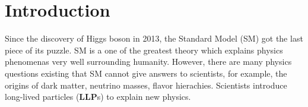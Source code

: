 \section{Introduction}
\label{sec:Introduction}

Since the discovery of Higgs boson in 2013, the Standard Model (SM) got the last piece of its puzzle. SM is a one of the greatest theory which explains physics phenomenas very well surrounding humanity. However, there are many physics questions existing that SM cannot give answers to scientists, for example, the origins of dark matter, neutrino masses, flavor hierachies. Scientists introduce long-lived particles (\textbf{LLP}s) to explain new physics.  
